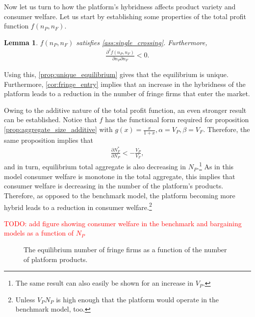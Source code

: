 \documentclass[a4paper]{article}
\newtheorem{lemma}{Lemma}
\begin{document}
Now let us turn to how the platform's hybridness affects product variety and consumer welfare.
Let us start by establishing some properties of the total profit function $f(n_P, n_F)$.
\begin{lemma}
    \label{lem:profit_assumptions}
    $f(n_P, n_F)$ satisfies \cref{ass:single_crossing}.
    Furthermore,
    \begin{align*}
        \frac{\partial^2 f(n_P, n_F)}{\partial n_P \partial n_F} < 0.
    \end{align*}
\end{lemma}
Using this, \cref{prop:unique_equilibrium} gives that the equilibrium is unique.
Furthermore, \cref{cor:fringe_entry} implies that an increase in the hybridness of the platform leads to a reduction in the number of fringe firms that enter the market.

Owing to the additive nature of the total profit function, an even stronger result can be established.
Notice that $f$ has the functional form required for proposition \ref{prop:aggregate_size_additive} with $g(x) = \frac{x}{1+x}, \alpha = V_P, \beta = V_F$.
Therefore, the same proposition implies that
\begin{align*}
    \frac{\partial N_F^*}{\partial N_P} < -\frac{V_P}{V_F},
\end{align*}
and in turn, equilibrium total aggregate is also decreasing in $N_P$.\footnote{
    The same result can also easily be shown for an increase in $V_P$.
}
As in this model consumer welfare is monotone in the total aggregate, this implies that consumer welfare is decreasing in the number of the platform's products.
Therefore, as opposed to the benchmark model, the platform becoming more hybrid leads to a reduction in consumer welfare.\footnote{
    Unless $V_P N_P$ is high enough that the platform would operate in the benchmark model, too.
}

\textcolor{red}{TODO: add figure showing consumer welfare in the benchmark and bargaining models as a function of $N_P$}

\begin{figure}
    \centering
    \caption{The equilibrium number of fringe firms as a function of the number of platform products.}
    \label{fig:fringe_entry_eq}
\end{figure}
\end{document}
